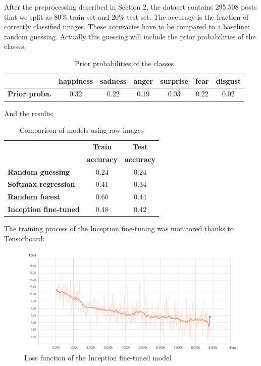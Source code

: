 After the preprocessing described in Section 2, the dataset contains 295,508 posts that we split as 80\% train set and 20\% test set. The accuracy is the fraction of correctly classified images. These accuracies have to be compared to a baseline: random guessing. Actually this guessing will include the prior probabilities of the classes: 
\begin{table}[H]
\begin{center}
    \begin{tabular}{| c | c | c | c | c | c | c |}
    \hline
     & \textbf{happiness} & \textbf{sadness} &  \textbf{anger} & \textbf{surprise} & \textbf{fear} & \textbf{disgust} \\ \hline
    \textbf{Prior proba.} & 0.32 & 0.22 & 0.19 & 0.03 & 0.22 & 0.02 \\
    \hline
    \end{tabular}
\end{center} 
\caption{Prior probabilities of the classes}
\end{table}

And the results:
\begin{table}[H]
\begin{center}
    \begin{tabular}{| l | c | c |}
    \hline
    & \textbf{Train} & \textbf{Test} \\
    & \textbf{accuracy} & \textbf{accuracy} \\ \hline
    \textbf{Random guessing} & 0.24 & 0.24 \\ \hline
    \textbf{Softmax regression} & 0.41 & 0.34 \\ \hline
    \textbf{Random forest}  & 0.60 & 0.44\\ \hline
    \textbf{Inception fine-tuned}  & 0.48 & 0.42 \\
    \hline
    \end{tabular}
\end{center} 
\caption{Comparison of models using raw images}
\end{table}

The training process of the Inception fine-tuning was monitored thanks to Tensorboard:
\begin{figure}[H]
    \centering
    \includegraphics[width=\textwidth]{Images/image_model_loss_cleaned.jpg}
    \caption{Loss function of the Inception fine-tuned model}
\end{figure}


